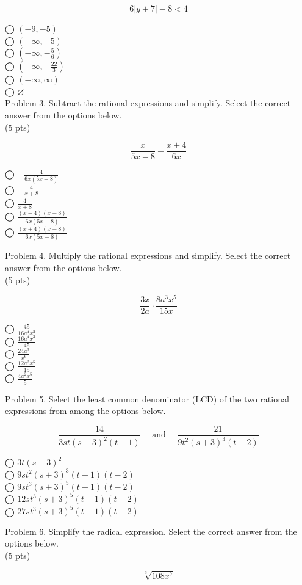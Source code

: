 \documentclass{ximera}
\begin{document}
$$6|y+7|-8<4$$

◯ $(-9,-5)$\\
◯ $(-\infty,-5)$\\
◯ $\left(-\infty,-\frac{5}{6}\right)$\\
◯ $\left(-\infty,-\frac{22}{3}\right)$\\
◯ $(-\infty, \infty)$\\
◯ $\varnothing$\\
Problem 3. Subtract the rational expressions and simplify. Select the correct answer from the options below.\\
(5 pts)

$$\frac{x}{5 x-8}-\frac{x+4}{6 x}$$

◯ $-\frac{4}{6 x(5 x-8)}$\\
◯ $-\frac{4}{x+8}$\\
◯ $\frac{4}{x+8}$\\
◯ $\frac{(x-4)(x-8)}{6 x(5 x-8)}$\\
◯ $\frac{(x+4)(x-8)}{6 x(5 x-8)}$

Problem 4. Multiply the rational expressions and simplify. Select the correct answer from the options below.\\
(5 pts)

$$\frac{3 x}{2 a} \cdot \frac{8 a^{3} x^{5}}{15 x}$$

◯ $\frac{45}{16 a^{4} x^{3}}$\\
◯ $\frac{16 a^{4} x^{3}}{45}$\\
◯ $\frac{24 a^{3}}{x^{6}}$\\
◯ $\frac{12 a^{2} x^{5}}{15}$\\
◯ $\frac{4 a^{2} x^{5}}{5}$

Problem 5. Select the least common denominator (LCD) of the two rational expressions from among the options below.

$$\frac{14}{3 s t(s+3)^{2}(t-1)} \quad \text { and } \quad \frac{21}{9 t^{2}(s+3)^{3}(t-2)}$$

◯ $3 t(s+3)^{2}$\\
◯ $9 s t^{2}(s+3)^{3}(t-1)(t-2)$\\
◯ $9 s t^{3}(s+3)^{5}(t-1)(t-2)$\\
◯ $12 s t^{3}(s+3)^{5}(t-1)(t-2)$\\
◯ $27 s t^{3}(s+3)^{5}(t-1)(t-2)$

Problem 6. Simplify the radical expression. Select the correct answer from the options below.\\
(5 pts)

$$\sqrt[3]{108 x^{7}}$$
\end{document}
